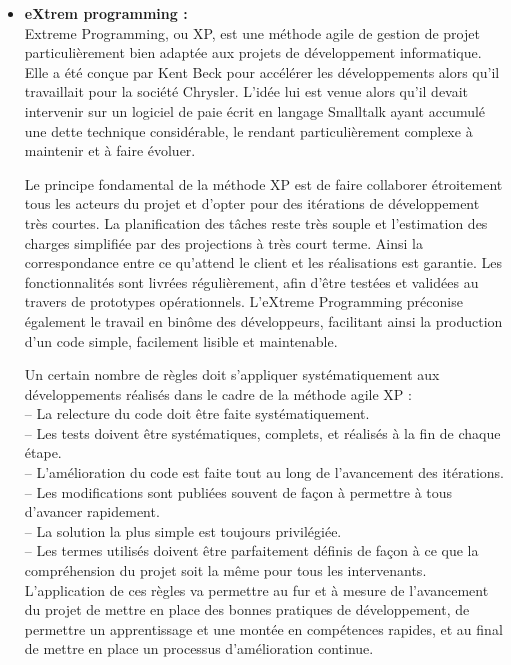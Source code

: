 \documentclass[a4paper, 12pt]{report}
\begin{document}
\begin{itemize}
    \item \textbf{eXtrem programming :}\\
    Extreme Programming, ou XP, est une méthode agile de gestion de projet particulièrement bien adaptée aux projets de développement informatique. Elle a été conçue par Kent Beck pour accélérer les développements alors qu’il travaillait pour la société Chrysler. L’idée lui est venue alors qu’il devait intervenir sur un logiciel de paie écrit en langage Smalltalk ayant accumulé une dette technique considérable, le rendant particulièrement complexe à maintenir et à faire évoluer. 

Le principe fondamental de la méthode XP est de faire collaborer étroitement tous les acteurs du projet et d’opter pour des itérations de développement très courtes. La planification des tâches reste très souple et l’estimation des charges simplifiée par des projections à très court terme. Ainsi la correspondance entre ce qu’attend le client et les réalisations est garantie. Les fonctionnalités sont livrées régulièrement, afin d’être testées et validées au travers de prototypes opérationnels. 
L’eXtreme Programming préconise également le travail en binôme des développeurs, facilitant ainsi la production d’un code simple, facilement lisible et maintenable. 


Un certain nombre de règles doit s’appliquer systématiquement aux développements réalisés dans le cadre de la méthode agile XP : \\
-- La relecture du code doit être faite systématiquement. \\
-- Les tests doivent être systématiques, complets, et réalisés à la fin de chaque étape. \\
-- L’amélioration du code est faite tout au long de l’avancement des itérations. \\
-- Les modifications sont publiées souvent de façon à permettre à tous d’avancer rapidement. \\
-- La solution la plus simple est toujours privilégiée. \\
-- Les termes utilisés doivent être parfaitement définis de façon à ce que la compréhension du projet soit la même pour tous les intervenants. \\

L’application de ces règles va permettre au fur et à mesure de  l’avancement du projet de mettre en place des bonnes pratiques de  développement, de permettre un apprentissage et une montée en  compétences rapides, et au final de mettre en place un processus d’amélioration continue. 


\end{itemize}
\end{document}
